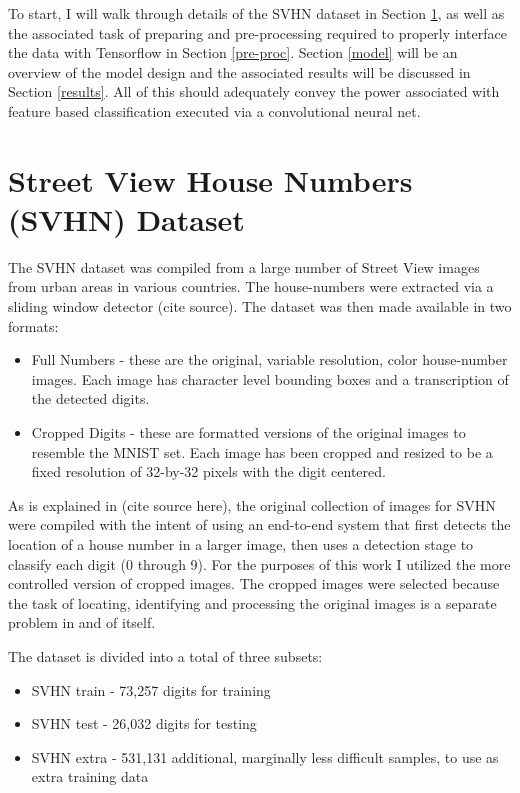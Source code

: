 \documentclass{article}
\begin{document}
	To start, I will walk through details of the SVHN dataset in Section \ref{dt_set}, as well as the associated task of preparing and pre-processing required to properly interface the data with Tensorflow in Section \ref{pre-proc}.  Section \ref{model} will be an overview of the model design and the associated results will be discussed in Section \ref{results}.  All of this should adequately convey the power associated with feature based classification executed via a convolutional neural net.
	
	\section{Street View House Numbers (SVHN) Dataset}
	\label{dt_set}
	
	The SVHN dataset was compiled from a large number of Street View images from urban areas in various countries.  The house-numbers were extracted via a sliding window detector (cite source).  The dataset was then made available in two formats:
	
	\begin{itemize}
		\item Full Numbers - these are the original, variable resolution, color house-number images. Each image has character level bounding boxes and a transcription of the detected digits.
		
		\item Cropped Digits - these are formatted versions of the original images to resemble the MNIST set. Each image has been cropped and resized to be a fixed resolution of 32-by-32 pixels with the digit centered.
		  
	\end{itemize}
	
	As is explained in (cite source here), the original collection of images for SVHN were compiled with the intent of using an end-to-end system that first detects the location of a house number in a larger image, then uses a detection stage to classify each digit (0 through 9).  For the purposes of this work I utilized the more controlled version of cropped images.  The cropped images were selected because the task of locating, identifying and processing the original images is a separate problem in and of itself.
	
	The dataset is divided into a total of three subsets:
	
	\begin{itemize}
		
		\item SVHN train - 73,257 digits for training
		\item SVHN test - 26,032 digits for testing
		\item SVHN extra - 531,131 additional, marginally less difficult samples, to use as extra training data
		
	\end{itemize}
\end{document}
